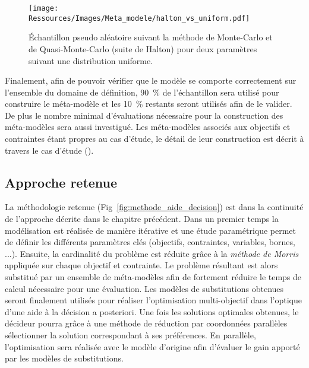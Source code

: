 \begin{figure}
    \begin{center}
        \texttt{[image: Ressources/Images/Meta\_modele/halton\_vs\_uniform.pdf]}
    \end{center}
    \caption{Échantillon pseudo aléatoire suivant la méthode de Monte-Carlo et de
             Quasi-Monte-Carlo (suite de Halton) pour deux paramètres suivant une
             distribution uniforme.
             \label{fig:halton_vs_uniform}}
\end{figure}

Finalement, afin de pouvoir vérifier que le modèle se comporte correctement sur l’ensemble
du domaine de définition, \SI{90}{\%} de l’échantillon sera utilisé pour construire le
méta-modèle et les \SI{10}{\%} restants seront utilisés afin de le valider. De plus le
nombre minimal d’évaluations nécessaire pour la construction des méta-modèles sera aussi
investigué. Les méta-modèles associés aux objectifs et contraintes étant propres au cas
d’étude, le détail de leur construction est décrit à travers le cas d’étude ().


\subsection{Approche retenue} %
\label{sub:approche_retenue_reduction}
La méthodologie retenue (Fig~\ref{fig:methode_aide_decision}) est dans la continuité de
l’approche décrite dans le chapitre précédent.
Dans un premier temps la modélisation est réalisée de manière itérative et une étude
paramétrique permet de définir les différents paramètres clés (objectifs, contraintes,
variables, bornes, ...). Ensuite, la cardinalité du problème est réduite grâce à la \textit{méthode
de Morris} appliquée sur chaque objectif et contrainte. Le problème résultant est alors
substitué par un ensemble de méta-modèles afin de fortement réduire le temps de calcul
nécessaire pour une évaluation. Les modèles de substitutions obtenues seront finalement
utilisés pour réaliser l’optimisation multi-objectif dans l’optique d’une aide à la
décision a posteriori. Une fois les solutions optimales obtenues, le décideur pourra grâce
à une méthode de réduction par coordonnées parallèles sélectionner la solution
correspondant à ses préférences. En parallèle, l’optimisation sera réalisée avec le modèle
d’origine afin d’évaluer le gain apporté par les modèles de substitutions.

